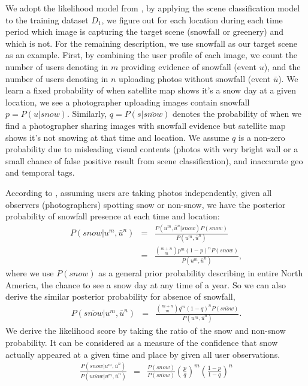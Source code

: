We adopt the likelihood model from , by applying the scene classification model 
to the training dataset $D_1$, we figure out for each location during each time period which image
is 
capturing the target scene (snowfall or greenery) and which is not. For the remaining description, 
we use snowfall as our target scene as an example. First, by combining the 
user profile of each image, we count the number of users denoting in $m$ providing evidence of 
snowfall (event $u$), and 
the number of users denoting in $n$ uploading photos without snowfall (event $\bar{u}$). We learn a 
fixed probability of when satellite map shows it's a snow day at a given location, we see a 
photographer 
uploading images contain snowfall $p = P(u|snow)$. Similarly, $q = P(s | \overline{snow})$ denotes 
the 
probability of when we find a photographer sharing images with snowfall evidence but 
satellite map shows it's not snowing at that time and location. We assume $q$ is a non-zero probability 
due to misleading visual contents (photos with very bright wall or a small chance of false positive 
result from scene classification), and inaccurate geo and temporal tags.

According to , assuming users are taking photos independently, 
given all observers (photographers) spotting snow 
or non-snow, we have the posterior probability of snowfall presence at each time and location:
%
%
\newcommand{\umun}{u^m, \bar{u}^n}
\newcommand{\umuntwo}{u^m, \bar{u}^n}
%
\begin{eqnarray*}
P(snow|\umun) &=&\frac{ P(\umun|snow)P(snow)}{P(\umuntwo)} \\
&=&\frac{{m+n\choose m}p^{m}(1-p)^{n}P(snow)}{P(\umuntwo)}, 
\end{eqnarray*}
%
where we use $P(snow)$ as a general prior probability describing in entire North America, 
the chance to see a snow day at 
any time of a year. So we can also derive the similar posterior probability for absence of snowfall,
%
\begin{eqnarray*}
P(\overline{snow}|\umun) &=&\frac{{m+n\choose m}q^{m}(1-q)^{n}P(\overline{snow})}{P(\umuntwo)}. 
\end{eqnarray*}
%
We derive the likelihood score by taking the ratio of the snow and non-snow probability.
It can be considered as a measure of the confidence that snow actually appeared at a given time 
and place 
by given all user observations.
%
\begin{eqnarray}
\frac{P(snow|\umun)}{P(\overline{unow}|\umuntwo)}
&=&\frac{P(snow)}{P(\overline{snow})}\left(\frac{p}{q}\right)^{m}\left(\frac{1-p}{1-q}\right)^n
\label{eq:conf}
\end{eqnarray}


